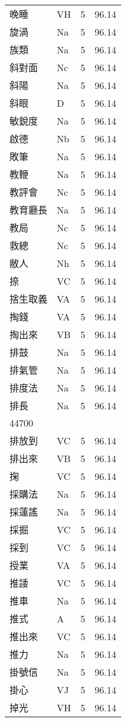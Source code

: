 \documentclass[twocolumn]{book}
\begin{document}
\begin{supertabular}{llrr}
晚睡 & VH & 5 &  96.14\\
旋渦 & Na & 5 &  96.14\\
族類 & Na & 5 &  96.14\\
斜對面 & Nc & 5 &  96.14\\
斜陽 & Na & 5 &  96.14\\
斜眼 & D & 5 &  96.14\\
敏銳度 & Na & 5 &  96.14\\
啟德 & Nb & 5 &  96.14\\
敗筆 & Na & 5 &  96.14\\
教鞭 & Na & 5 &  96.14\\
教評會 & Nc & 5 &  96.14\\
教育廳長 & Na & 5 &  96.14\\
教局 & Nc & 5 &  96.14\\
救總 & Nc & 5 &  96.14\\
敝人 & Nh & 5 &  96.14\\
捺 & VC & 5 &  96.14\\
捨生取義 & VA & 5 &  96.14\\
掏錢 & VA & 5 &  96.14\\
掏出來 & VB & 5 &  96.14\\
排鼓 & Na & 5 &  96.14\\
排氣管 & Na & 5 &  96.14\\
排度法 & Na & 5 &  96.14\\
排長 & Na & 5 &  96.14\\
44700\\
排放到 & VC & 5 &  96.14\\
排出來 & VB & 5 &  96.14\\
掬 & VC & 5 &  96.14\\
採購法 & Na & 5 &  96.14\\
採蓮謠 & Na & 5 &  96.14\\
採掘 & VC & 5 &  96.14\\
採到 & VC & 5 &  96.14\\
授業 & VA & 5 &  96.14\\
推諉 & VC & 5 &  96.14\\
推車 & Na & 5 &  96.14\\
推式 & A & 5 &  96.14\\
推出來 & VC & 5 &  96.14\\
推力 & Na & 5 &  96.14\\
掛號信 & Na & 5 &  96.14\\
掛心 & VJ & 5 &  96.14\\
掉光 & VH & 5 &  96.14\\

\end{supertabular}
\end{document}
